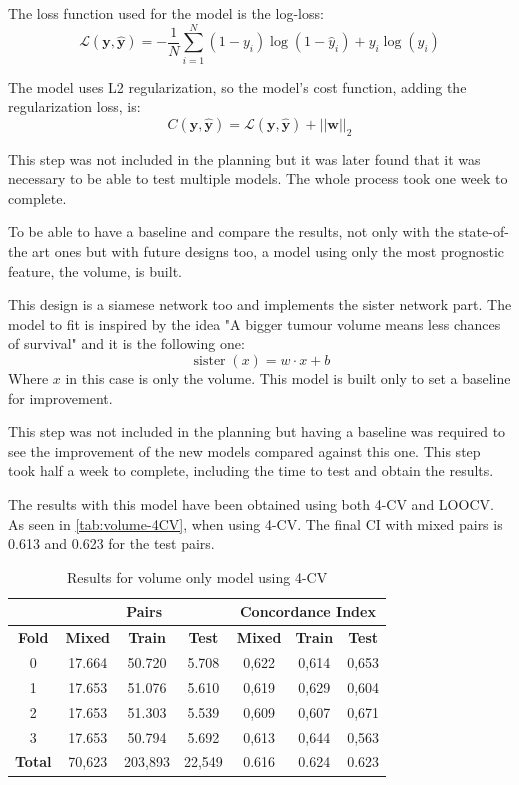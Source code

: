 The loss function used for the model is the log-loss:
\[
  \mathcal{L}(\bm{y}, \hat{\bm{y}}) = -\frac{1}{N} \sum_{i = 1}^{N}
  (1 - y_i)\log(1 - \hat{y}_i) + y_i\log(\hat{y}_i)
\]

The model uses L2 regularization, so the model's cost function, 
adding the regularization loss, is:
\[
  C(\bm{y}, \hat{\bm{y}}) = \mathcal{L}(\bm{y}, \hat{\bm{y}}) + 
  ||\bm{w}||_2
\]

This step was not included in the planning but it was later found that it was necessary to be 
able to test multiple models. The whole process took one week to complete.


To be able to have a baseline and compare the results, not only with the state-of-the art ones
but with future designs too, a model using only the most prognostic feature, the volume, is 
built.

This design is a siamese network too and implements the sister network part. The model to fit
is inspired by the idea "A bigger tumour volume means less chances of 
survival" and it is the following one:
\[
  \operatorname{sister}(x) = w\cdot x + b
\]
Where \( x \) in this case is only the volume. This model is built only to set a 
baseline for improvement.

This step was not included in the planning but having a baseline was required to see the 
improvement of the new models compared against this one. This step took half a week to complete,
including the time to test and obtain the results.


The results with this model have been obtained using both 4-CV and \gls{LOOCV}.
As seen in \autoref{tab:volume-4CV}, when using 4-CV. The final \gls{CI} with mixed pairs
is 0.613 and 0.623 for the test pairs.

\begin{table}
  \centering
  \begin{tabular}{|c||c|c|c||c|c|c|}
    \cline{2-7}
    \multicolumn{1}{c|}{} & \multicolumn{3}{|c||}{\textbf{Pairs}} & 
    \multicolumn{3}{c|}{\textbf{Concordance Index}} \\
    \hline
    \textbf{Fold} & \textbf{Mixed} & \textbf{Train} & \textbf{Test} 
    & \textbf{Mixed} & \textbf{Train} & \textbf{Test} \\
    \hhline{=======}
    0 & 17.664 & 50.720 & 5.708 & 0,622 & 0,614 & 0,653 \\
    1 & 17.653 & 51.076 & 5.610 & 0,619 & 0,629 & 0,604 \\
    2 & 17.653 & 51.303 & 5.539 & 0,609 & 0,607 & 0,671 \\
    3 & 17.653 & 50.794 & 5.692 & 0,613 & 0,644 & 0,563 \\
    \hhline{=======}
    \textbf{Total} & 70,623 & 203,893 & 22,549 & 0.616 & 0.624 & 0.623 \\
    \hline
  \end{tabular}

  \caption[Results Volume Only Model 4CV]{
    Results for volume only model using 4-CV \label{tab:volume-4CV}
  }
\end{table}

